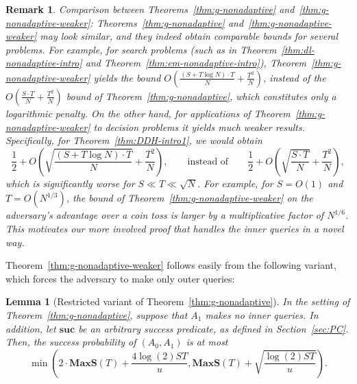 \documentclass[11pt]{article}
\newtheorem{remark}[theorem]{Remark}
\newtheorem{lemma}[theorem]{Lemma}
\newcommand{\SUC}{\boldsymbol{suc}}
\newcommand{\MAXS}{\boldsymbol{MaxS}}
\begin{document}
\begin{remark}  \label{rem:comparison} Comparison between Theorems~\ref{thm:g-nonadaptive} and~\ref{thm:g-nonadaptive-weaker}:
Theorems~\ref{thm:g-nonadaptive} and~\ref{thm:g-nonadaptive-weaker} may look similar, and they indeed obtain comparable bounds for several problems. For example, for search problems (such as in Theorem~\ref{thm:dl-nonadaptive-intro} and Theorem~\ref{thm:em-nonadaptive-intro}), Theorem~\ref{thm:g-nonadaptive-weaker} yields the bound $O(\frac{(S + T \log N) \cdot T}{N} + \frac{T^2}{N})$, instead of the $O(\frac{S \cdot T}{N} + \frac{T^2}{N})$ bound of Theorem~\ref{thm:g-nonadaptive}, which constitutes only a logarithmic penalty. On the other hand, for applications of Theorem~\ref{thm:g-nonadaptive-weaker} to decision problems it yields much weaker results. Specifically, for Theorem~\ref{thm:DDH-intro1}, 
we would obtain 
$$\frac{1}{2} + O\left(\sqrt{\frac{(S + T \log N) \cdot T}{N}}+ \frac{T^2}{N}\right), \qquad \mbox{instead of} \qquad 
\frac{1}{2} + O\left(\sqrt{\frac{S \cdot T}{N}} + \frac{T^2}{N}\right),$$
which is significantly worse for $S \ll T \ll \sqrt{N}$. For example, for $S=O(1)$ and $T = O(N^{1/3})$, the bound of Theorem~\ref{thm:g-nonadaptive-weaker} on the adversary's advantage over a coin toss is larger by a multiplicative factor of $N^{1/6}$. This motivates our more involved proof that handles the inner queries in a novel way.
\end{remark}

Theorem~\ref{thm:g-nonadaptive-weaker} follows easily from the following variant, which forces the adversary to make only outer queries:

\begin{lemma}[Restricted variant of Theorem~\ref{thm:g-nonadaptive}] \label{lem:non-fixed g-nonadaptive}
In the setting of Theorem~\ref{thm:g-nonadaptive}, suppose that $A_1$ makes no inner queries.
In addition, let $\SUC$ be an arbitrary success predicate, as defined in Section~\ref{sec:PC}.
Then, the success probability of $(A_0,A_1)$ is at most
\[
\min \left(2\cdot \MAXS(T) + \frac{4\log(2) S T }{u}, \MAXS(T) + 
\sqrt{\frac{\log(2) ST} {{u}}} \right).
\]
\end{lemma}
\end{document}
